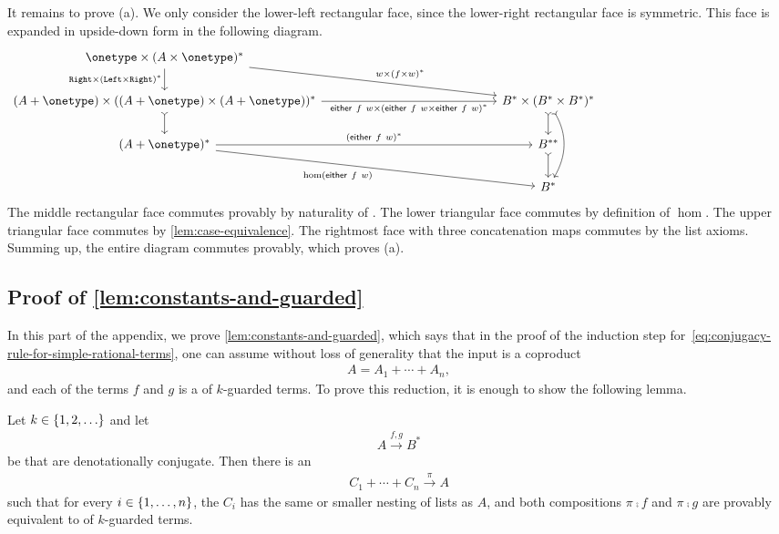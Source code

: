 It remains to prove (a). We only consider the lower-left rectangular face, since the lower-right rectangular face is symmetric. This face is expanded in upside-down form in  the following diagram.
    \[
\begin{tikzcd}
    [column sep=5cm]
\onetype \times (A \times \onetype)^*
\ar[dr,"w \times (f \times w)^*"]
\ar[d,"{\rightterm \times (\leftterm \times \rightterm)^*}"']
\\
(A+\onetype) \times ((A + \onetype) \times (A + \onetype))^*
\ar[d,\concar]
\ar[r,"{\either{f}{w} \times (\either{f}{w} \times \either{f}{w})^*}"']
& 
B^* \times (B^* \times  B^*)^*
\ar[d, \concar]
\ar[dd, bend left, \concar]
\\ 
(A + \onetype)^*
\ar[dr,"{\hom(\either{f}{w})}"']
\ar[r,"(\either f w)^*"]
& 
B^{**}
\ar[d,\concar]& 
\ \\
& B^*
\end{tikzcd}
\]
The middle rectangular face commutes  provably by naturality of . The lower triangular face commutes by definition of $\hom$. The upper triangular face commutes by \cref{lem:case-equivalence}. The rightmost face with three concatenation maps commutes by the list axioms. 
Summing up, the entire diagram commutes provably, which proves (a).

\subsection{Proof of \cref{lem:constants-and-guarded}}
\label{sec:proof-of-lem:constants-and-guarded}
In this part of the appendix, we prove \cref{lem:constants-and-guarded},
which says that in the proof of the induction step for~\eqref{eq:conjugacy-rule-for-simple-rational-terms}, one can assume without loss of generality that the input  is a coproduct 
\begin{align*}
A = A_1 + \cdots + A_n,
\end{align*}
and each of the terms $f$ and $g$ is a  of $k$-guarded terms.  To prove this reduction, it is enough to show the following lemma. 
\begin{lemma}  \label{lem:value-extraction}
    Let $k \in \{1,2,\ldots\}$ and let 
    \begin{align*}
    A \xrightarrow {f,g} B^*
    \end{align*}
    be  that are  denotationally conjugate. Then there is  an  
    \begin{align*}
 C_1 + \cdots + C_n \xrightarrow \pi A
    \end{align*}
    such that for every $i \in \{1,\ldots,n\}$, the  $C_i$ has the same or smaller nesting of lists as $A$, and both compositions $\pi\comp{}f$ and $\pi\comp{}g$ are provably equivalent to  of $k$-guarded terms.
\end{lemma}

